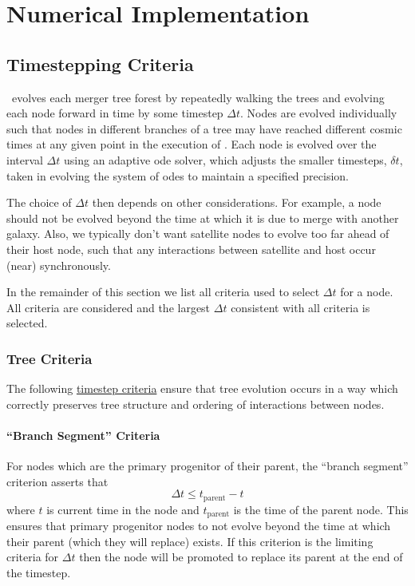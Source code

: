 \chapter{Numerical Implementation}

\section{Timestepping Criteria}\label{sec:TimesteppingCriteria}

\glc\ evolves each merger tree forest by repeatedly walking the trees and evolving each node forward in time by some timestep $\Delta t$. Nodes are evolved individually such that nodes in different branches of a tree may have reached different cosmic times at any given point in the execution of \glc. Each node is evolved over the interval $\Delta t$ using an adaptive \gls{ode} solver, which adjusts the smaller timesteps, $\delta t$, taken in evolving the system of \glspl{ode} to maintain a specified precision.

The choice of $\Delta t$ then depends on other considerations. For example, a node should not be evolved beyond the time at which it is due to merge with another galaxy. Also, we typically don't want satellite nodes to evolve too far ahead of their host node, such that any interactions between satellite and host occur (near) synchronously.

In the remainder of this section we list all criteria used to select $\Delta t$ for a node. All criteria are considered and the largest $\Delta t$ consistent with all criteria is selected.

\subsection{Tree Criteria}

The following \hyperlink{merger_trees.evolve.F90:merger_trees_evolve:evolve_to_time}{timestep criteria} ensure that tree evolution occurs in a way which correctly preserves tree structure and ordering of interactions between \glspl{node}.

\subsubsection{``Branch Segment'' Criteria}

For \glspl{node} which are the \gls{primary progenitor} of their \gls{parent}, the ``branch segment'' criterion asserts that
\begin{equation}
 \Delta t \le t_\mathrm{parent} - t
\end{equation}
where $t$ is current time in the \gls{node} and $t_\mathrm{parent}$ is the time of the \gls{parent} \gls{node}. This ensures that \gls{primary progenitor} \glspl{node} to not evolve beyond the time at which their \gls{parent} (which they will replace) exists.  If this criterion is the limiting criteria for $\Delta t$ then the \gls{node} will be promoted to replace its \gls{parent} at the end of the timestep. 

